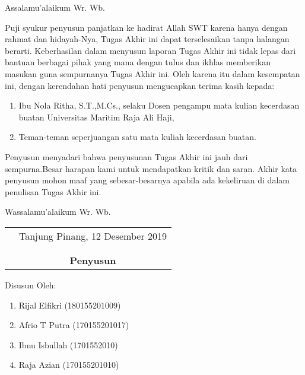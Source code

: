 \documentclass{jtetiskripsi}
\begin{document}
\cover


\preface
Assalamu'alaikum Wr. Wb.

\vspace{0.5cm}

Puji syukur penyusun panjatkan ke hadirat Allah SWT karena hanya dengan rahmat dan hidayah-Nya, Tugas Akhir ini dapat terselesaikan tanpa halangan berarti. Keberhasilan dalam menyusun laporan Tugas Akhir ini tidak lepas dari bantuan berbagai pihak yang mana dengan tulus dan ikhlas memberikan masukan guna sempurnanya Tugas Akhir ini. Oleh karena itu dalam kesempatan ini, dengan kerendahan hati penyusun mengucapkan terima kasih kepada:

\begin{enumerate}
\item{Ibu Nola Ritha, S.T.,M.Cs., selaku Dosen pengampu mata kulian kecerdasan buatan Universitas Maritim Raja Ali Haji},
\item Teman-teman seperjuangan satu mata kuliah kecerdasan buatan.

\end{enumerate}


Penyusun menyadari bahwa penyusunan Tugas Akhir ini jauh dari sempurna.Besar harapan kami untuk mendapatkan kritik dan saran. Akhir kata penyusun mohon maaf yang sebesar-besarnya apabila ada kekeliruan di dalam penulisan Tugas Akhir ini.

\vspace{0.5cm}

Wassalamu'alaikum Wr. Wb.

\begin{tabular}{p{7.5cm}c}
&Tanjung Pinang, 12 Desember 2019\\
&\\
&\\
&\textbf{Penyusun}
\end{tabular}

\newpage
\noindent Disusun Oleh:
\begin{enumerate}
	\item Rijal Elfikri (180155201009)
	\item Afrio T Putra (170155201017)
	\item Ibnu Isbullah (1701552010)
	\item Raja Azian (170155201010)
\end{enumerate}
\end{document}
